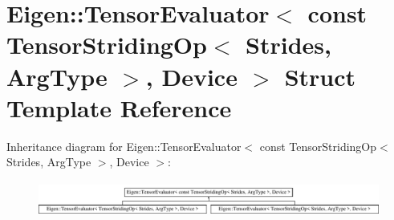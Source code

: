 \hypertarget{struct_eigen_1_1_tensor_evaluator_3_01const_01_tensor_striding_op_3_01_strides_00_01_arg_type_01_4_00_01_device_01_4}{}\section{Eigen\+:\+:Tensor\+Evaluator$<$ const Tensor\+Striding\+Op$<$ Strides, Arg\+Type $>$, Device $>$ Struct Template Reference}
\label{struct_eigen_1_1_tensor_evaluator_3_01const_01_tensor_striding_op_3_01_strides_00_01_arg_type_01_4_00_01_device_01_4}
Inheritance diagram for Eigen\+:\+:Tensor\+Evaluator$<$ const Tensor\+Striding\+Op$<$ Strides, Arg\+Type $>$, Device $>$\+:\begin{figure}[H]
\begin{center}
\leavevmode
\includegraphics[height=1.169102cm]{struct_eigen_1_1_tensor_evaluator_3_01const_01_tensor_striding_op_3_01_strides_00_01_arg_type_01_4_00_01_device_01_4}
\end{center}
\end{figure}
